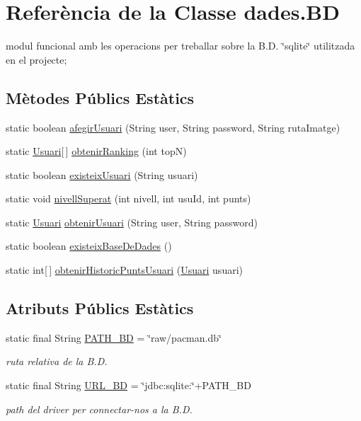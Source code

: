 \hypertarget{classdades_1_1_b_d}{\section{Referència de la Classe dades.\+B\+D}
\label{classdades_1_1_b_d}
}


modul funcional amb les operacions per treballar sobre la B.\+D. \char`\"{}sqlite\char`\"{} utilitzada en el projecte;  


\subsection*{Mètodes Públics Estàtics}
\begin{DoxyCompactItemize}
\item 
static boolean \hyperlink{classdades_1_1_b_d_aebeb79a5b559c404967e7af4a51fbe07}{afegir\+Usuari} (String user, String password, String ruta\+Imatge)
\item 
static \hyperlink{classlogica_1_1_usuari}{Usuari}\mbox{[}$\,$\mbox{]} \hyperlink{classdades_1_1_b_d_adecdaacdefdcf4c26e307c3c6b13cbca}{obtenir\+Ranking} (int top\+N)
\item 
static boolean \hyperlink{classdades_1_1_b_d_ad5629c3a6ea389ca0ec6fe6f71f49e5a}{existeix\+Usuari} (String usuari)
\item 
static void \hyperlink{classdades_1_1_b_d_aee65076de634577866799db9ea3315b8}{nivell\+Superat} (int nivell, int usu\+Id, int punts)
\item 
static \hyperlink{classlogica_1_1_usuari}{Usuari} \hyperlink{classdades_1_1_b_d_ae8a0bfc4f5c75e66fd6ba1a6c9568b07}{obtenir\+Usuari} (String user, String password)
\item 
static boolean \hyperlink{classdades_1_1_b_d_a60b00af9b05e556fd66b8dbf69e012cd}{existeix\+Base\+De\+Dades} ()
\item 
static int\mbox{[}$\,$\mbox{]} \hyperlink{classdades_1_1_b_d_a9820e3cbf955816cc7e4e8aabb5d313b}{obtenir\+Historic\+Punts\+Usuari} (\hyperlink{classlogica_1_1_usuari}{Usuari} usuari)
\end{DoxyCompactItemize}
\subsection*{Atributs Públics Estàtics}
\begin{DoxyCompactItemize}
\item 
static final String \hyperlink{classdades_1_1_b_d_a9d49f7827869e7e71b4527473b673ce8}{P\+A\+T\+H\+\_\+\+B\+D} = \char`\"{}raw/pacman.\+db\char`\"{}
\begin{DoxyCompactList}\small\item\em ruta relativa de la B.\+D. \end{DoxyCompactList}\item 
static final String \hyperlink{classdades_1_1_b_d_abc83c541acdcd0be2ae8a33daa753077}{U\+R\+L\+\_\+\+B\+D} = \char`\"{}jdbc\+:sqlite\+:\char`\"{}+P\+A\+T\+H\+\_\+\+B\+D
\begin{DoxyCompactList}\small\item\em path del driver per connectar-\/nos a la B.\+D. \end{DoxyCompactList}\end{DoxyCompactItemize}


